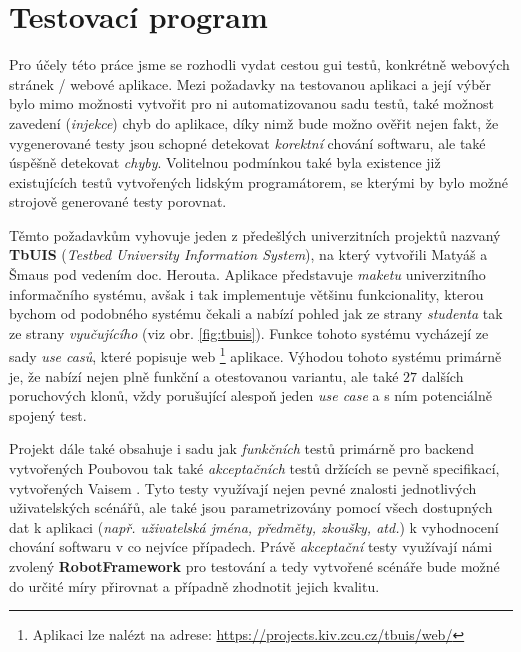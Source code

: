 \documentclass[czech, ma, kiv, he, iso690numb, pdf, viewonly]{fasthesis}
\begin{document}
    \section{Testovací program} \label{sec:test_program}

    Pro účely této práce jsme se rozhodli vydat cestou \acrshort{gui} testů, konkrétně webových stránek / webové aplikace. Mezi požadavky na testovanou aplikaci a její výběr bylo mimo možnosti vytvořit pro ni automatizovanou sadu testů, také možnost zavedení (\emph{injekce}) chyb do aplikace, díky nimž bude možno ověřit nejen fakt, že vygenerované testy jsou schopné detekovat \textit{korektní} chování softwaru, ale také úspěšně detekovat \textit{chyby}. Volitelnou podmínkou také byla existence již existujících testů vytvořených lidským programátorem, se kterými by bylo možné strojově generované testy porovnat.
    
    Těmto požadavkům vyhovuje jeden z předešlých univerzitních projektů nazvaný \textbf{TbUIS} (\textit{Testbed University Information System}), na který vytvořili Matyáš \cite{Matyas2018} a Šmaus \cite{Smaus2019} pod vedením doc. Herouta. Aplikace představuje \textit{maketu} univerzitního informačního systému, avšak i tak implementuje většinu funkcionality, kterou bychom od podobného systému čekali a nabízí pohled jak ze strany \textit{studenta} tak ze strany \textit{vyučujícího} (viz obr. \ref{fig:tbuis}). Funkce tohoto systému vycházejí ze sady \textit{use casů}, které popisuje web \footnote{Aplikaci lze nalézt na adrese: \url{https://projects.kiv.zcu.cz/tbuis/web/}} aplikace. Výhodou tohoto systému primárně je, že nabízí nejen plně funkční a otestovanou variantu, ale také \(27\) dalších poruchových klonů, vždy porušující alespoň jeden \textit{use case} a s ním potenciálně spojený test.

    Projekt dále také obsahuje i sadu jak \textit{funkčních} testů primárně pro backend vytvořených Poubovou \cite{Poubova2019} tak také \textit{akceptačních} testů držících se pevně specifikací, vytvořených Vaisem \cite{Vais2020}. Tyto testy využívají nejen pevné znalosti jednotlivých uživatelských scénářů, ale také jsou parametrizovány pomocí všech dostupných dat k aplikaci (\textit{např. uživatelská jména, předměty, zkoušky, atd.}) k vyhodnocení chování softwaru v co nejvíce případech. Právě \textit{akceptační} testy využívají námi zvolený \textbf{RobotFramework} pro testování a tedy vytvořené scénáře bude možné do určité míry přirovnat a případně zhodnotit jejich kvalitu. 
\end{document}
